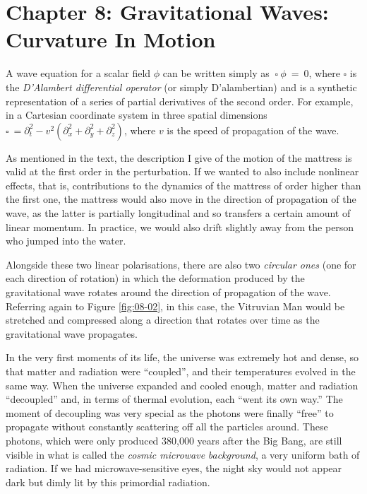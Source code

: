 \section*{Chapter 8: Gravitational Waves: Curvature In Motion}
\begin{description}[style=multiline,leftmargin=2em,labelwidth=1.5em]

\item[1.]\hypertarget{note:08-01}{}A wave equation for a scalar field \(\phi\) can be written simply as
\(\ \square\ \phi\  = \ 0\), where \(\square\) is the \emph{D'Alambert differential
operator} (or simply D'alambertian) and is a synthetic representation
of a series of partial derivatives of the second order. For example, in a Cartesian
coordinate system in three spatial dimensions
\(\square\  = \partial_{t}^{2} - v^{2}(\partial_{x}^{2} + \partial_{y}^{2} + \partial_{z}^{2})\),
where \(v\) is the speed of propagation of the wave.

\item[2.]\hypertarget{note:08-02}{}As mentioned in the text, the description I give of the motion of the mattress is valid
at the first order in the perturbation. If we wanted to also include nonlinear effects,
that is, contributions to the dynamics of the mattress of order higher than the first
one, the mattress would also move in the direction of propagation of the wave, as the
latter is partially longitudinal and so transfers a certain amount of linear momentum.
In practice, we would also drift slightly away from the person who jumped into the
water.

\item[3.]\hypertarget{note:08-03}{}Alongside these two linear polarisations, there are also two \emph{circular
ones} (one for each direction of rotation) in which the deformation
produced by the gravitational wave rotates around the direction of propagation of the
wave. Referring again to Figure \ref{fig:08-02}, in this case, the Vitruvian Man
would be stretched and compressed along a direction that rotates over time as the
gravitational wave propagates.

\item[4.]\hypertarget{note:08-04}{}In the very first moments of its life, the universe was extremely hot and dense, so that
matter and radiation were ``coupled'', and their temperatures evolved in the same way.
When the universe expanded and cooled enough, matter and radiation ``decoupled'' and, in
terms of thermal evolution, each ``went its own way.'' The moment of decoupling was very
special as the photons were finally ``free'' to propagate without constantly scattering
off all the particles around. These photons, which were only produced 380,000 years
after the Big Bang, are still visible in what is called the \emph{cosmic
microwave} \emph{background}, a very uniform bath of radiation. If we
had microwave-sensitive eyes, the night sky would not appear dark but dimly lit by this
primordial radiation.


\end{description}
